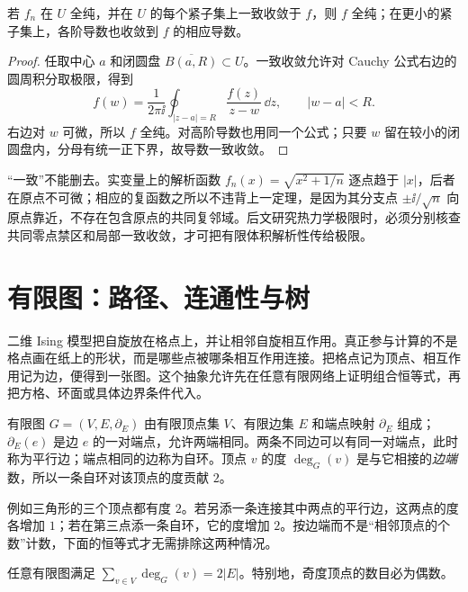 \begin{proposition}[局部一致极限仍全纯]
若 \(f_n\) 在 \(U\) 全纯，并在 \(U\) 的每个紧子集上一致收敛于 \(f\)，则 \(f\) 全纯；在更小的紧子集上，各阶导数也收敛到 \(f\) 的相应导数。
\end{proposition}

\begin{proof}
任取中心 \(a\) 和闭圆盘 \(\overline{B(a,R)}\subset U\)。一致收敛允许对 Cauchy 公式右边的圆周积分取极限，得到
\[
 f(w)=\frac{1}{2\pi\ii}\oint_{|z-a|=R}
       \frac{f(z)}{z-w}\,\dd z,
 \qquad |w-a|<R.
\]
右边对 \(w\) 可微，所以 \(f\) 全纯。对高阶导数也用同一个公式；只要 \(w\) 留在较小的闭圆盘内，分母有统一正下界，故导数一致收敛。
\end{proof}

“一致”不能删去。实变量上的解析函数
\(f_n(x)=\sqrt{x^2+1/n}\) 逐点趋于 \(|x|\)，后者在原点不可微；相应的复函数之所以不违背上一定理，是因为其分支点 \(\pm\ii/\sqrt n\) 向原点靠近，不存在包含原点的共同复邻域。后文研究热力学极限时，必须分别核查共同零点禁区和局部一致收敛，才可把有限体积解析性传给极限。

\section{有限图：路径、连通性与树}
\label{sec:advanced-graph-foundations}

二维 Ising 模型把自旋放在格点上，并让相邻自旋相互作用。真正参与计算的不是格点画在纸上的形状，而是哪些点被哪条相互作用连接。把格点记为顶点、相互作用记为边，便得到一张图。这个抽象允许先在任意有限网络上证明组合恒等式，再把方格、环面或具体边界条件代入。

\begin{definition}[有限图与顶点的度]
有限图 $G=(V,E,\partial_E)$ 由有限顶点集 $V$、有限边集 $E$ 和端点映射 $\partial_E$ 组成；$\partial_E(e)$ 是边 $e$ 的一对端点，允许两端相同。两条不同边可以有同一对端点，此时称为平行边；端点相同的边称为自环。顶点 $v$ 的度 $\deg_G(v)$ 是与它相接的\emph{边端}数，所以一条自环对该顶点的度贡献 $2$。
\end{definition}

例如三角形的三个顶点都有度 $2$。若另添一条连接其中两点的平行边，这两点的度各增加 $1$；若在第三点添一条自环，它的度增加 $2$。按边端而不是“相邻顶点的个数”计数，下面的恒等式才无需排除这两种情况。

\begin{proposition}[握手引理]
任意有限图满足 $\sum_{v\in V}\deg_G(v)=2|E|$。特别地，奇度顶点的数目必为偶数。
\end{proposition}

